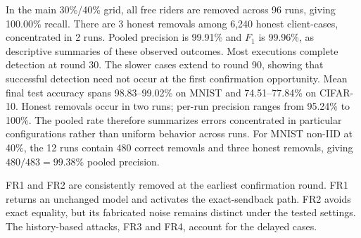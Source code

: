 \documentclass[journal]{IEEEtran}
\begin{document}
In the main 30\%/40\% grid, all free riders are removed across 96 runs, giving
100.00\% recall. There are 3 honest removals among
6,240 honest client-cases, concentrated in
2 runs. Pooled precision is 99.91\% and
$F_1$ is 99.96\%, as descriptive summaries of these observed outcomes.
Most executions complete detection at round 30. The slower cases extend
to round 90, showing that successful detection need
not occur at the first confirmation opportunity. Mean final test
accuracy spans 98.83--99.02\% on MNIST
and 74.51--77.84\% on CIFAR-10.
Honest removals occur in two runs; per-run precision ranges from 95.24\%
to 100\%. The pooled rate therefore summarizes errors concentrated in
particular configurations rather than uniform behavior across runs.
For MNIST non-IID at 40\%, the 12 runs contain 480 correct removals
and three honest removals, giving $480/483=99.38\%$ pooled precision.

FR1 and FR2 are consistently removed at the earliest confirmation round.
FR1 returns an unchanged model and activates the exact-sendback path.
FR2 avoids exact equality, but its fabricated noise remains distinct
under the tested settings. The history-based attacks, FR3 and FR4,
account for the delayed cases.
\end{document}
